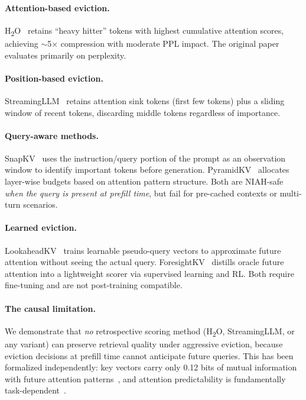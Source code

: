 \paragraph{Attention-based eviction.}
H\textsubscript{2}O~\citep{h2o2023} retains ``heavy hitter'' tokens with highest cumulative attention scores, achieving $\sim$5$\times$ compression with moderate PPL impact.
The original paper evaluates primarily on perplexity.

\paragraph{Position-based eviction.}
StreamingLLM~\citep{streamingllm2024} retains attention sink tokens (first few tokens) plus a sliding window of recent tokens, discarding middle tokens regardless of importance.

\paragraph{Query-aware methods.}
SnapKV~\citep{snapkv2024} uses the instruction/query portion of the prompt as an observation window to identify important tokens before generation.
PyramidKV~\citep{pyramidkv2024} allocates layer-wise budgets based on attention pattern structure.
Both are NIAH-safe \emph{when the query is present at prefill time}, but fail for pre-cached contexts or multi-turn scenarios.

\paragraph{Learned eviction.}
LookaheadKV~\citep{lookaheadkv2026} trains learnable pseudo-query vectors to approximate future attention without seeing the actual query.
ForesightKV~\citep{foresightkv2026} distills oracle future attention into a lightweight scorer via supervised learning and RL.
Both require fine-tuning and are not post-training compatible.

\paragraph{The causal limitation.}
We demonstrate that \emph{no} retrospective scoring method (H\textsubscript{2}O, StreamingLLM, or any variant) can preserve retrieval quality under aggressive eviction, because eviction decisions at prefill time cannot anticipate future queries.
This has been formalized independently: key vectors carry only 0.12 bits of mutual information with future attention patterns~\citep{limits-scoring-2026}, and attention predictability is fundamentally task-dependent~\citep{tappa2025}.

